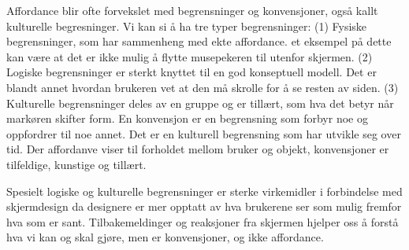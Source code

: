 \noindent
Affordance blir ofte forvekslet med begrensninger og konvensjoner, også kallt kulturelle begresninger. Vi kan si å ha tre typer begrensninger: (1) Fysiske begrensninger, som har sammenheng med ekte affordance. et eksempel på dette kan være at det er ikke mulig å flytte musepekeren til utenfor skjermen. (2) Logiske begrensninger er sterkt knyttet til en god konseptuell modell. Det er blandt annet hvordan brukeren vet at den må skrolle for å se resten av siden. (3) Kulturelle begrensninger deles av en gruppe og er tillært, som hva det betyr når markøren skifter form. En konvensjon er en begrensning som forbyr noe og oppfordrer til noe annet. Det er en kulturell begrensning som har utvikle seg over tid. Der affordanve viser til forholdet mellom bruker og objekt, konvensjoner er tilfeldige, kunstige og tillært.\cite{Norman99}

\noindent
Spesielt logiske og kulturelle begrensninger er sterke virkemidler i forbindelse med skjermdesign da designere er mer opptatt av hva brukerene ser som mulig fremfor hva som er sant. Tilbakemeldinger og reaksjoner fra skjermen hjelper oss å forstå hva vi kan og skal gjøre, men er konvensjoner, og ikke affordance.\cite{Norman99}